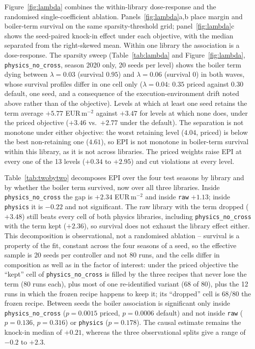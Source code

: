 Figure~\ref{fig:lambda} combines the within-library dose-response and the randomised
single-coefficient ablation. Panels~\ref{fig:lambda}a,b place margin and boiler-term
survival on the same sparsity-threshold grid; panel~\ref{fig:lambda}c shows the
seed-paired knock-in effect under each objective, with the median separated from the
right-skewed mean. Within one library the association is a dose-response. The sparsity sweep
(Table~\ref{tab:lambda} and Figure~\ref{fig:lambda}, \texttt{physics\_no\_cross}, season
2020 only, 20 seeds per level) shows the boiler term dying between $\lambda=0.03$
(survival $0.95$) and $\lambda=0.06$ (survival $0$) in both waves, whose survival profiles
differ in one cell only ($\lambda=0.04$: $0.35$ priced against $0.30$ default, one seed,
and a consequence of the execution-environment drift noted above rather than of the
objective). Levels at which at least one seed retains the term average $+5.77$
EUR\,m$^{-2}$ against $+3.47$ for levels at which none does, under the priced objective
($+3.46$ vs.\ $+2.77$ under the default). The separation is not monotone under either
objective: the worst retaining level ($4.04$, priced) is below the best non-retaining one
($4.61$), so EPI is not monotone in boiler-term survival within this library, as it is
not across libraries. The priced weights raise EPI at every one of the
13 levels ($+0.34$ to $+2.95$) and cut violations at every level.

Table~\ref{tab:twobytwo} decomposes EPI over the four test seasons by library and by
whether the boiler term survived, now over all three libraries. Inside
\texttt{physics\_no\_cross} the gap is $+2.34$ EUR\,m$^{-2}$ and inside \texttt{raw}
$+1.13$; inside \texttt{physics} it is $-0.22$ and not significant. The raw library with
the term dropped ($+3.48$) still beats every cell of both physics libraries,
including \texttt{physics\_no\_cross} with the term kept ($+2.36$), so survival does
not exhaust the library effect either. This decomposition is observational, not a
randomised ablation -- survival is a property of the fit, constant across the four seasons
of a seed, so the effective sample is 20 seeds per controller and not 80 runs, and the
cells differ in composition as well as in the factor of interest: under the priced
objective the ``kept'' cell of \texttt{physics\_no\_cross} is filled by the three recipes
that never lose the term (80 runs each), plus most of one re-identified variant (68 of 80),
plus the 12 runs in which the frozen recipe happens to keep it; its ``dropped'' cell is
68/80 the frozen recipe. Between seeds the boiler
association is significant only inside \texttt{physics\_no\_cross} ($p=0.0015$ priced,
$p=0.0006$ default) and not inside \texttt{raw} ($p=0.136$, $p=0.316$) or
\texttt{physics} ($p=0.178$). The causal estimate remains the knock-in median of $+0.21$,
whereas the three observational splits give a range of $-0.2$ to $+2.3$.

